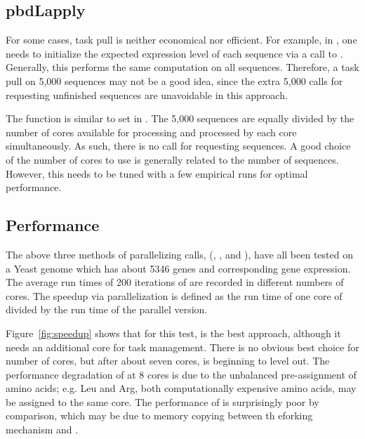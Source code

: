 \subsection[pbdLapply]{pbdLapply}
\label{sec:pbdLapply}

For some cases, task pull is neither economical nor efficient. For example, in
, one needs to initialize the expected expression level of each 
sequence via a call to . Generally, this performs the 
same computation on all sequences. Therefore, a task pull on 5,000
sequences may not be a good idea, since the extra 5,000 calls for requesting 
unfinished sequences are unavoidable in this approach.

The function  is similar to set 
in . The 5,000 sequences are equally divided by the number of 
cores available for processing and processed by each core simultaneously. 
As such, there is no call for requesting sequences. A good 
choice of the number of cores to use is generally related to the number of 
sequences. However, this needs to be tuned with a few empirical runs for 
optimal performance.


\subsection[Performance]{Performance}
\label{sec:performance}

The above three methods of parallelizing  calls,  
(, , and
), have all been tested on a Yeast genome which has about 
5346 genes and corresponding gene expression. The average run times of 200 
iterations of  are recorded in different numbers of cores. 
The speedup via parallelization is defined as the run time of one core of 
 divided by the run time of the parallel version.

Figure~\ref{fig:speedup} shows that for this test,  is the 
best approach, although it needs an additional core for task management. 
There is no obvious best choice for number of cores, but after about seven 
cores,  is beginning to level out.  The 
performance degradation of  at 8 cores is due to the 
unbalanced pre-assignment of amino acids; e.g. Leu and Arg, both 
computationally expensive amino acids, may be assigned to the same core.
The performance of  is surprisingly poor by comparison, which 
may be due to memory copying between th eforking mechanism and 
. 


